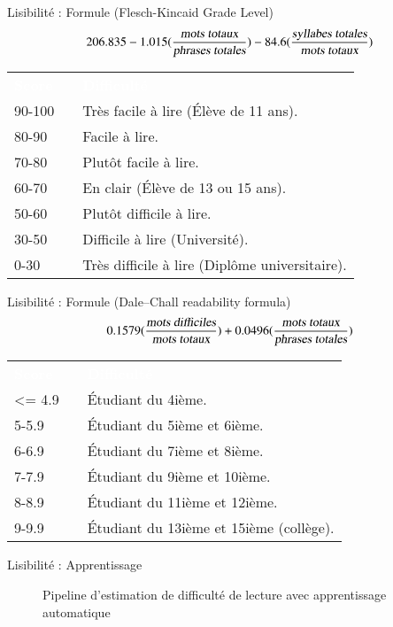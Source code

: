 \documentclass{KodeBook}
\begin{document}
Lisibilité : Formule (Flesch-Kincaid Grade Level)
\[
206.835 - 1.015 (\frac{\text{\slshape mots totaux}}{\text{\slshape phrases totales}})
- 84.6 (\frac{\text{\slshape syllabes totales}}{\text{\slshape mots totaux}})
\]

\begin{center}
	\footnotesize
	\begin{tabular}{p{}lp{}}
		\rowcolor{darkblue}
		\bfseries\textcolor{white}{Score} && \bfseries\textcolor{white}{Difficulté}\\
		90-100 && Très facile à lire (Élève de 11 ans). \\
		80-90 && Facile à lire. \\
		70-80 && Plutôt facile à lire.\\
		60-70 && En clair (Élève de 13 ou 15 ans). \\
		50-60 && Plutôt difficile à lire. \\
		30-50 && Difficile à lire (Université). \\
		0-30 && Très difficile à lire (Diplôme universitaire). \\
	\end{tabular}
\end{center}

Lisibilité : Formule (Dale–Chall readability formula)
\[
0.1579 (\frac{\text{\slshape mots difficiles}}{\text{\slshape mots totaux}})
+ 0.0496 (\frac{\text{\slshape mots totaux}}{\text{\slshape phrases totales}})
\]

\begin{center}
	\footnotesize
	\begin{tabular}{p{}lp{}}
		\rowcolor{darkblue}
		\bfseries\textcolor{white}{Score} && \bfseries\textcolor{white}{Difficulté}\\
		\textless= 4.9 && Étudiant du 4ième. \\
		5-5.9 && Étudiant du 5ième et 6ième. \\
		6-6.9 && Étudiant du 7ième et 8ième.\\
		7-7.9 && Étudiant du 9ième et 10ième. \\
		8-8.9 && Étudiant du 11ième et 12ième. \\
		9-9.9 && Étudiant du 13ième et 15ième (collège). \\
	\end{tabular}
\end{center}

Lisibilité : Apprentissage
\begin{figure}
	\centering
	\caption{Pipeline d'estimation de difficulté de lecture avec apprentissage automatique \cite{2014-collins}}
\end{figure}
\end{document}
